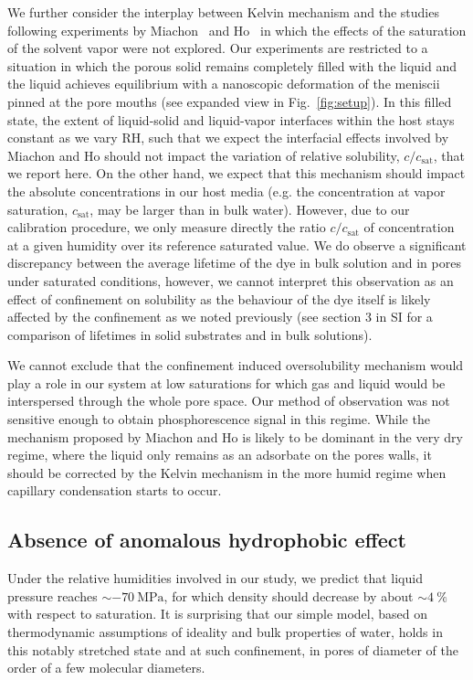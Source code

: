 \documentclass[aps,prl,twocolumn,superscriptaddress,groupedaddress]{revtex4}
\begin{document}
We further consider the interplay between Kelvin mechanism and the studies following experiments by Miachon~\cite{miachon_2008} and Ho~\cite{ho_2011} in which the effects of the saturation of the solvent vapor were not explored. Our experiments are restricted to a situation in which the porous solid remains completely filled with the liquid and the liquid achieves equilibrium with a nanoscopic deformation of the meniscii pinned at the pore mouths (see expanded view in Fig.~\ref{fig:setup}). In this filled state, the extent of liquid-solid and liquid-vapor interfaces within the host stays constant as we vary $\mathrm{RH}$, such that we expect the interfacial effects involved by Miachon and Ho should not impact the variation of relative solubility, $c/c_\text{sat}$, that we report here. On the other hand, we expect that this mechanism should impact the absolute concentrations in our host media (e.g. the concentration at vapor saturation, $c_\text{sat}$, may be larger than in bulk water). However, due to our calibration procedure, we only measure directly the ratio $c/c_\text{sat}$ of concentration at a given humidity over its reference saturated value. We do observe a significant discrepancy between the average lifetime of the dye in bulk solution and in pores under saturated conditions, however, we cannot interpret this observation as an effect of confinement on solubility as the behaviour of the dye itself is likely affected by the confinement as we noted previously (see section 3 in SI for a comparison of lifetimes in solid substrates and in bulk solutions).

We cannot exclude that the confinement induced oversolubility mechanism would play a role in our system at low saturations for which gas and liquid would be interspersed through the whole pore space. Our method of observation was not sensitive enough to obtain phosphorescence signal in this regime. While the mechanism proposed by Miachon and Ho is likely to be dominant in the very dry regime, where the liquid only remains as an adsorbate on the pores walls, it should be corrected by the Kelvin mechanism in the more humid regime when capillary condensation starts to occur.

\subsection{Absence of anomalous hydrophobic effect}

Under the relative humidities involved in our study, we predict that liquid pressure reaches $\sim -\SI{70}{\mega\pascal}$, for which density should decrease by about $\sim \SI{4}{\percent}$ with respect to saturation.  It is surprising that our simple model, based on thermodynamic assumptions of ideality and bulk properties of water, holds in this notably stretched state and at such confinement, in pores of diameter of the order of a few molecular diameters.
\end{document}
